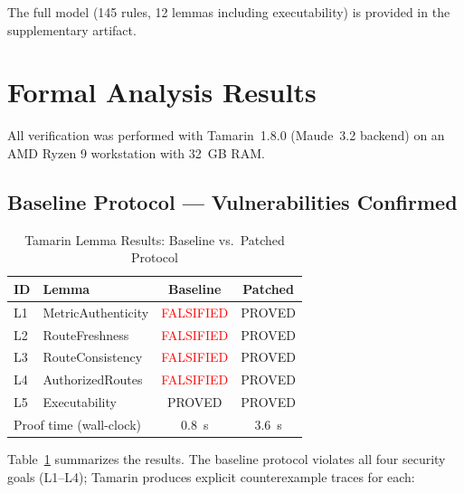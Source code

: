 \documentclass[journal]{IEEEtran}
\begin{document}
The full model (145 rules, 12 lemmas including executability) is
provided in the supplementary artifact.

\section{Formal Analysis Results}
\label{sec:results}

All verification was performed with Tamarin~1.8.0 (Maude~3.2 backend)
on an AMD Ryzen 9 workstation with 32~GB RAM.

\subsection{Baseline Protocol — Vulnerabilities Confirmed}

\begin{table}[t]
  \centering
  \caption{Tamarin Lemma Results: Baseline vs.\ Patched Protocol}
  \label{tab:lemma-results}
  \begin{tabular}{llcc}
    \toprule
    \textbf{ID} & \textbf{Lemma} & \textbf{Baseline} & \textbf{Patched} \\
    \midrule
    L1 & MetricAuthenticity  & \textcolor{red}{FALSIFIED}  & \textcolor{green!60!black}{PROVED} \\
    L2 & RouteFreshness      & \textcolor{red}{FALSIFIED}  & \textcolor{green!60!black}{PROVED} \\
    L3 & RouteConsistency    & \textcolor{red}{FALSIFIED}  & \textcolor{green!60!black}{PROVED} \\
    L4 & AuthorizedRoutes    & \textcolor{red}{FALSIFIED}  & \textcolor{green!60!black}{PROVED} \\
    L5 & Executability       & \textcolor{green!60!black}{PROVED}   & \textcolor{green!60!black}{PROVED} \\
    \midrule
    \multicolumn{2}{l}{Proof time (wall-clock)} & 0.8~s & 3.6~s \\
    \bottomrule
  \end{tabular}
\end{table}

Table~\ref{tab:lemma-results} summarizes the results. The baseline
protocol violates all four security goals (L1–L4); Tamarin produces
explicit counterexample traces for each:
\end{document}
